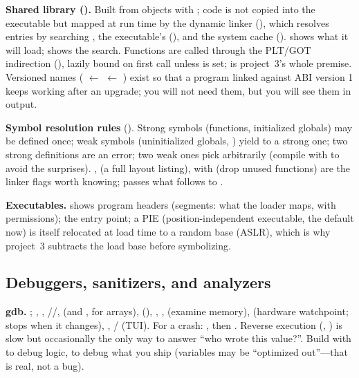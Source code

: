 \textbf{Shared library ().} Built from  objects with ; code is not copied into the executable but mapped at run time by the dynamic linker (), which resolves  entries by searching , the executable's  (), and the system cache ().  shows what it will load;  shows the search. Functions are called through the PLT/GOT indirection (), lazily bound on first call unless  is set;  is project~3's whole premise. Versioned names ( $\leftarrow$  $\leftarrow$ ) exist so that a program linked against ABI version 1 keeps working after an upgrade; you will not need them, but you will see them in  output.

\textbf{Symbol resolution rules} (). Strong symbols (functions, initialized globals) may be defined once; weak symbols (uninitialized globals, ) yield to a strong one; two strong definitions are an error; two weak ones pick arbitrarily (compile with  to avoid the surprises). ,  (a full layout listing),  with  (drop unused functions) are the linker flags worth knowing;  passes what follows to .

\textbf{Executables.}  shows program headers (segments: what the loader maps, with permissions);  the entry point; a PIE (position-independent executable, the default now) is itself relocated at load time to a random base (ASLR), which is why project~3 subtracts the load base before symbolizing.

\subsection{Debuggers, sanitizers, and analyzers}

\textbf{gdb.} ; , , //,  (and ,  for arrays),  (), , ,  (examine memory),  (hardware watchpoint; stops when it changes), , / (TUI). For a crash: , then . Reverse execution (, ) is slow but occasionally the only way to answer ``who wrote this value?''. Build with  to debug logic,  to debug what you ship (variables may be ``optimized out''---that is real, not a bug).

